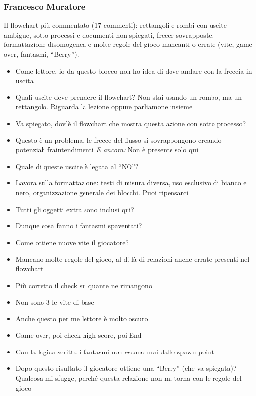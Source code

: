 \subsubsection{Francesco Muratore}
Il flowchart più commentato (17 commenti): rettangoli e rombi con uscite
ambigue, sotto-processi e documenti non spiegati, frecce sovrapposte,
formattazione disomogenea e molte regole del gioco mancanti o errate (vite,
game over, fantasmi, ``Berry'').
{\small
\begin{itemize}
  \item Come lettore, io da questo blocco non ho idea di dove andare con la freccia in uscita
  \item Quali uscite deve prendere il flowchart? Non stai usando un rombo, ma un rettangolo. Riguarda la lezione oppure parliamone insieme
  \item Va spiegato, dov'è il flowchart che mostra questa azione con sotto processo?
  \item Questo è un problema, le frecce del flusso si sovrappongono creando potenziali fraintendimenti \emph{E ancora:} Non è presente solo qui
  \item {} Quale di queste uscite è legata al ``NO''?
  \item Lavora sulla formattazione: testi di misura diversa, uso esclusivo di bianco e nero, organizzazione generale dei blocchi. Puoi ripensarci
  \item {} Tutti gli oggetti extra sono inclusi qui?
  \item {} Dunque cosa fanno i fantasmi spaventati?
  \item Come ottiene nuove vite il giocatore?
  \item Mancano molte regole del gioco, al di là di relazioni anche errate presenti nel flowchart
  \item {} Più corretto il check su quante ne rimangono
  \item {} Non sono 3 le vite di base
  \item Anche questo per me lettore è molto oscuro
  \item {} Game over, poi check high score, poi End
  \item {} Con la logica scritta i fantasmi non escono mai dallo spawn point
  \item {} Dopo questo risultato il giocatore ottiene una ``Berry'' (che va spiegata)? Qualcosa mi sfugge, perché questa relazione non mi torna con le regole del gioco
\end{itemize}
}

